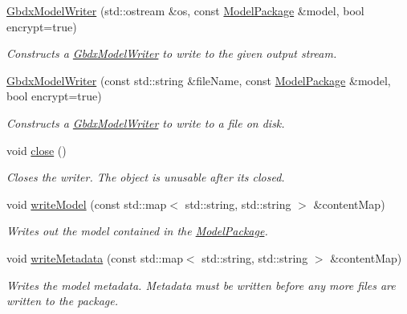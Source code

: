\begin{DoxyCompactItemize}
\item 
\hyperlink{group___classification_module_ga783393c4251282622db262338581da20}{Gbdx\+Model\+Writer} (std\+::ostream \&os, const \hyperlink{classdg_1_1deepcore_1_1classification_1_1_model_package}{Model\+Package} \&model, bool encrypt=true)
\begin{DoxyCompactList}\small\item\em Constructs a \hyperlink{classdg_1_1deepcore_1_1classification_1_1_gbdx_model_writer}{Gbdx\+Model\+Writer} to write to the given output stream. \end{DoxyCompactList}\item 
\hyperlink{group___classification_module_ga6806ebdaff05b3ff528a9c0fff8fe494}{Gbdx\+Model\+Writer} (const std\+::string \&file\+Name, const \hyperlink{classdg_1_1deepcore_1_1classification_1_1_model_package}{Model\+Package} \&model, bool encrypt=true)
\begin{DoxyCompactList}\small\item\em Constructs a \hyperlink{classdg_1_1deepcore_1_1classification_1_1_gbdx_model_writer}{Gbdx\+Model\+Writer} to write to a file on disk. \end{DoxyCompactList}\item 
void \hyperlink{group___classification_module_gabb8c5d415c526a83a3c4e9222bfada9b}{close} ()
\begin{DoxyCompactList}\small\item\em Closes the writer. The object is unusable after it\textquotesingle{}s closed. \end{DoxyCompactList}\item 
void \hyperlink{group___classification_module_gaddc807cb470f47457237613199395f54}{write\+Model} (const std\+::map$<$ std\+::string, std\+::string $>$ \&content\+Map)
\begin{DoxyCompactList}\small\item\em Writes out the model contained in the \hyperlink{classdg_1_1deepcore_1_1classification_1_1_model_package}{Model\+Package}. \end{DoxyCompactList}\item 
void \hyperlink{group___classification_module_gaf870ec5ffa5611fbc185a31964180c25}{write\+Metadata} (const std\+::map$<$ std\+::string, std\+::string $>$ \&content\+Map)
\begin{DoxyCompactList}\small\item\em Writes the model metadata. Metadata must be written before any more files are written to the package. \end{DoxyCompactList}\item 

\end{DoxyCompactItemize}
